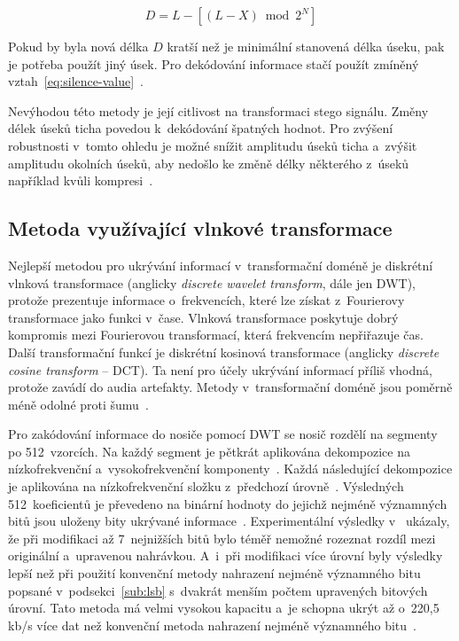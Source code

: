 \begin{equation}
    \label{eq:silence-length}
    D = L - [(L - X) \bmod 2^N]
\end{equation}

\noindent Pokud by byla nová délka $D$ kratší než je minimální stanovená délka
úseku, pak je potřeba použít jiný úsek. Pro dekódování informace stačí použít
zmíněný vztah~\ref{eq:silence-value}~\cite{Shahreza2008}.

Nevýhodou této metody je její citlivost na transformaci stego signálu. Změny
délek úseků ticha povedou k~dekódování špatných hodnot. Pro zvýšení robustnosti
v~tomto ohledu je možné snížit amplitudu úseků ticha a~zvýšit amplitudu
okolních úseků, aby nedošlo ke změně délky některého z~úseků například kvůli
kompresi~\cite{Djebbar2012}.

\subsection*{Metoda využívající vlnkové transformace}
\label{sub:wavelet-transform}

Nejlepší metodou pro ukrývání informací v~transformační doméně je diskrétní
vlnková transformace (anglicky \textit{discrete wavelet transform}, dále jen
DWT), protože prezentuje informace o~frekvencích, které lze získat z~Fourierovy
transformace jako funkci v~čase. Vlnková transformace poskytuje dobrý kompromis
mezi Fourierovou transformací, která frekvencím nepřiřazuje čas. Další
transformační funkcí je diskrétní kosinová transformace (anglicky
\textit{discrete cosine transform} -- DCT). Ta není pro účely ukrývání
informací příliš vhodná, protože zavádí do audia artefakty. Metody
v~transformační doméně jsou poměrně méně odolné proti šumu~\cite{Dutta2020}.

Pro zakódování informace do nosiče pomocí DWT se nosič rozdělí na segmenty po
512~vzorcích. Na každý segment je pětkrát aplikována dekompozice na
nízkofrekvenční a~vysokofrekvenční komponenty~\cite{Cvejic2002Wavelet}. Každá
následující dekompozice je aplikována na nízkofrekvenční složku z~předchozí
úrovně~\cite{Prabakaran2012}. Výsledných 512~koeficientů je převedeno na
binární hodnoty do jejichž nejméně významných bitů jsou uloženy bity ukrývané
informace~\cite{Cvejic2002Wavelet}. Experimentální výsledky
v~\cite{Cvejic2002Wavelet} ukázaly, že při modifikaci až 7~nejnižších bitů bylo
téměř nemožné rozeznat rozdíl mezi originální a~upravenou nahrávkou. A~i~při
modifikaci více úrovní byly výsledky lepší než při použití konvenční metody
nahrazení nejméně významného bitu popsané v~podsekci~\ref{sub:lsb} s~dvakrát
menším počtem upravených bitových úrovní. Tato metoda má velmi vysokou kapacitu
a~je schopna ukrýt až o~220,5\,kb/s více dat než konvenční metoda nahrazení
nejméně významného bitu~\cite{Cvejic2002Wavelet}.

